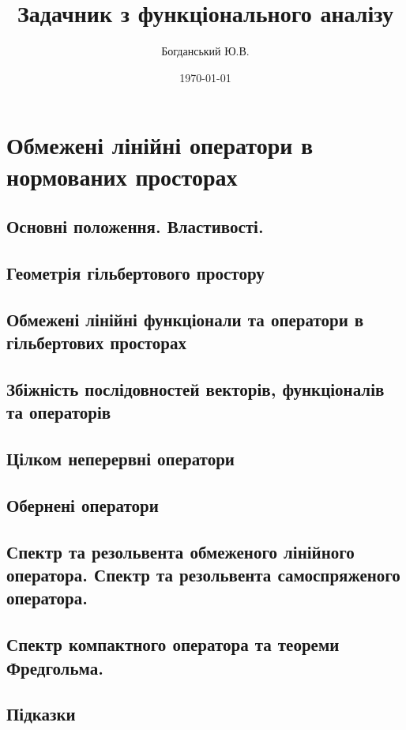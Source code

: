 \documentclass{extreport}
\author{Богданський Ю.В.}
\title{Задачник з функціонального аналізу}
\date{\today}
\begin{document}
    \maketitle
    \tableofcontents
    \chapter{Обмежені лінійні оператори в нормованих просторах}
        \section{Основні положення. Властивості.}
            
            
            
        \section{Геометрія гільбертового простору}
            
            
            
            
        \section{Обмежені лінійні функціонали та оператори в гільбертових просторах}
            
            
            
            
        \section{Збіжність послідовностей векторів, функціоналів та операторів}
            
            
            
        \section{Цілком неперервні оператори}
            
            
            
              
        \section{Обернені оператори}
            
            
            
        \section{Спектр та резольвента обмеженого лінійного оператора. 
                 Спектр та резольвента самоспряженого оператора.}
            
            
            
        \section{Спектр компактного оператора та теореми Фредгольма.}
            
        \newpage
        \section*{Підказки}
            
\end{document}
